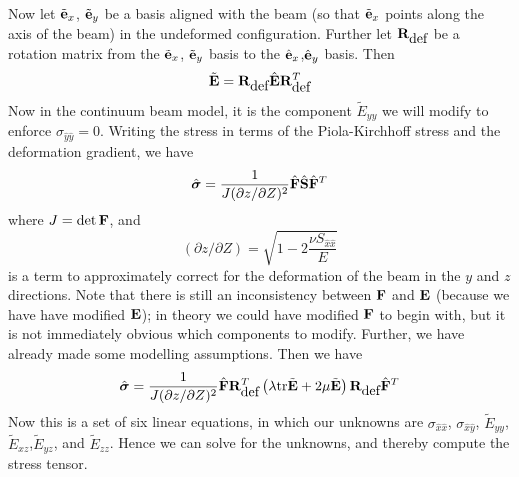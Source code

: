 \documentclass{article}
\begin{document}
Now let $\tilde{\bf e}_x$, $\tilde{\bf e}_y$ be a basis aligned with the beam (so that $\tilde{\bf e}_x$ points along the axis of the beam) in the undeformed configuration.
Further let ${\bf R}_{\mbox{def}}$ be a rotation matrix from the $\tilde{\bf e}_x$, $\tilde{\bf e}_y$ basis to the $\hat{\bf e}_x$,$\hat{\bf e}_y$  basis.
Then 
\begin{equation} \tilde{\bf E} = {\bf R}_{\mbox{def}} \hat {\bf E} {\bf R}_{\mbox{def}}^T  \label{eq:eq7800} \end{equation}
Now in the continuum beam model, it is the component $\tilde{E}_{yy}$ we will modify to enforce $\sigma_{\hat{y}\hat{y}} = 0$.
Writing the stress in terms of the Piola-Kirchhoff stress and the deformation gradient, we have
\begin{equation} \hat{ \boldsymbol \sigma  } = \frac{1}{J(\partial z / \partial Z)^2}\hat{\bf F} \hat{\bf S} \hat{\bf F}^T  \label{eq:eq7900} \end{equation}
where $J = \det{\bf F}$, and 
\begin{equation} (\partial z / \partial Z) = \sqrt{1-2\frac{\nu S_{\hat{x}\hat{x}}}{E}} \label{eq:eq8000} \end{equation}
is a term to approximately correct for the deformation of the beam in the $y$ and $z$ directions. 
Note that there is still an inconsistency between ${\bf F}$ and ${\bf E}$  (because we have have modified ${\bf E}$); in theory we could have modified ${\bf F}$ to begin with, but it is not immediately obvious which components to modify.
Further, we have already made some modelling assumptions.
Then we have 
\begin{equation} \hat{ \boldsymbol \sigma  } = \frac{1}{J(\partial z / \partial Z)^2}\hat{\bf F} {\bf R}_{\mbox{def}}^T \left(\lambda \mbox{tr} \tilde{\bf E} + 2\mu \tilde{\bf E}\right){\bf R}_{\mbox{def}}  \hat{\bf F}^T  \label{eq:eq8100} \end{equation}
Now this is a set of six linear equations, in which our unknowns are $\sigma_{\hat{x}\hat{x}}$, $\sigma_{\hat{x}\hat{y}}$, $\tilde{E}_{yy}$,$\tilde{E}_{xz}$,$\tilde{E}_{yz}$, and $\tilde{E}_{zz}$.
Hence we can solve for the unknowns, and thereby compute the stress tensor.
\end{document}
